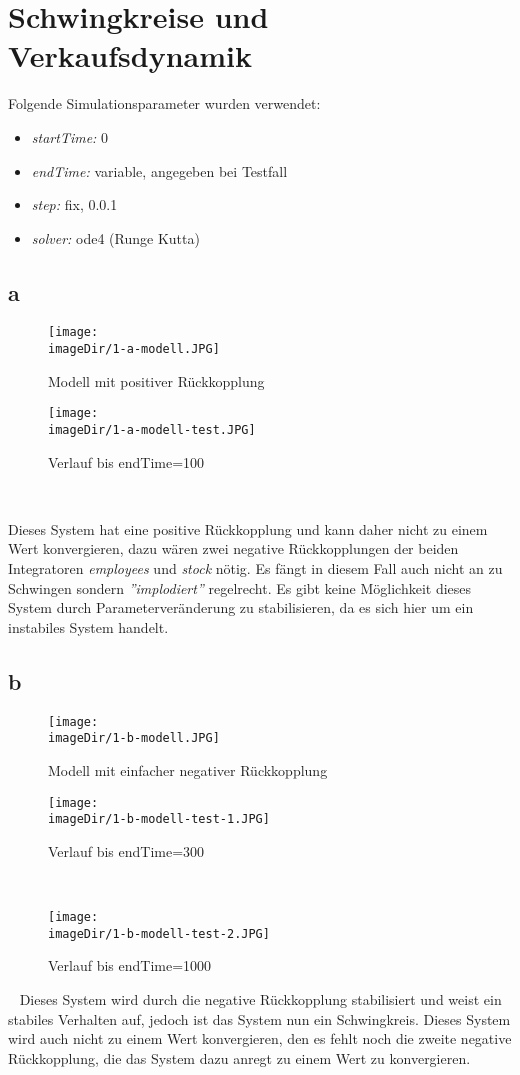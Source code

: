 \section{Schwingkreise und Verkaufsdynamik}
Folgende Simulationsparameter wurden verwendet:
\begin{itemize}
	\item\emph{startTime:} 0
	\item\emph{endTime:} variable, angegeben bei Testfall
	\item\emph{step:} fix, 0.0.1
	\item\emph{solver:} ode4 (Runge Kutta)
\end{itemize}
\subsection{a}
\begin{figure}[h]
	\centering
	\texttt{[image: \\imageDir/1-a-modell.JPG]}
	\caption{Modell mit positiver Rückkopplung}
	\label{fig:1-a-modell}
\end{figure}
\begin{figure}[h]
\centering
\texttt{[image: \\imageDir/1-a-modell-test.JPG]}
\caption{Verlauf bis endTime=100}
\label{fig:1-a-modell-test}
\end{figure}
\ \newpage

Dieses System hat eine positive Rückkopplung und kann daher nicht zu einem Wert konvergieren, dazu wären zwei negative Rückkopplungen der beiden Integratoren \emph{employees} und \emph{stock} nötig. Es fängt in diesem Fall auch nicht an zu Schwingen sondern \emph{''implodiert''} regelrecht. Es gibt keine Möglichkeit dieses System durch Parameterveränderung zu stabilisieren, da es sich hier um ein instabiles System handelt.

\subsection{b}
\begin{figure}[h]
	\centering
	\texttt{[image: \\imageDir/1-b-modell.JPG]}
	\caption{Modell mit einfacher negativer Rückkopplung}
	\label{fig:1-b-modell}
\end{figure}
\begin{figure}[h]
	\centering
	\texttt{[image: \\imageDir/1-b-modell-test-1.JPG]}
	\caption{Verlauf bis endTime=300}
	\label{fig:1-b-modell-test-1}
\end{figure}
\ \newpage

\begin{figure}[h]
	\centering
	\texttt{[image: \\imageDir/1-b-modell-test-2.JPG]}
	\caption{Verlauf bis endTime=1000}
	\label{fig:1-b-modell-test-2}
\end{figure}
\ \newline
Dieses System wird durch die negative Rückkopplung stabilisiert und weist ein stabiles Verhalten auf, jedoch ist das System nun ein Schwingkreis. Dieses System wird auch nicht zu einem Wert konvergieren, den es fehlt noch die zweite negative Rückkopplung, die das System dazu anregt zu einem Wert zu konvergieren.

